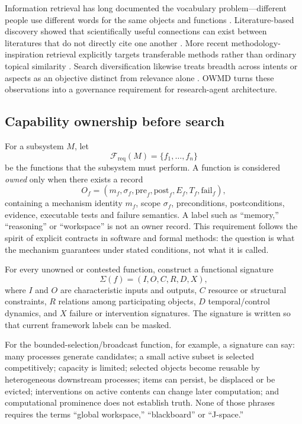 \documentclass[11pt]{article}
\begin{document}
Information retrieval has long documented the vocabulary problem---different people use different words for the same objects and functions \cite{furnas1987}. Literature-based discovery showed that scientifically useful connections can exist between literatures that do not directly cite one another \cite{swanson1986}. More recent methodology-inspiration retrieval explicitly targets transferable methods rather than ordinary topical similarity \cite{garikaparthi2025}. Search diversification likewise treats breadth across intents or aspects as an objective distinct from relevance alone \cite{carbonell1998}. OWMD turns these observations into a governance requirement for research-agent architecture.

\subsection{Capability ownership before search}

For a subsystem \(M\), let
\[
\mathcal F_{\mathrm{req}}(M)=\{f_1,\ldots,f_n\}
\]
be the functions that the subsystem must perform. A function is considered \emph{owned} only when there exists a record
\[
O_f=(m_f,\sigma_f,\mathrm{pre}_f,\mathrm{post}_f,E_f,T_f,\mathrm{fail}_f),
\]
containing a mechanism identity \(m_f\), scope \(\sigma_f\), preconditions, postconditions, evidence, executable tests and failure semantics. A label such as ``memory,'' ``reasoning'' or ``workspace'' is not an owner record. This requirement follows the spirit of explicit contracts in software and formal methods: the question is what the mechanism guarantees under stated conditions, not what it is called.

For every unowned or contested function, construct a functional signature
\[
\Sigma(f)=(I,O,C,R,D,X),
\]
where \(I\) and \(O\) are characteristic inputs and outputs, \(C\) resource or structural constraints, \(R\) relations among participating objects, \(D\) temporal/control dynamics, and \(X\) failure or intervention signatures. The signature is written so that current framework labels can be masked.

For the bounded-selection/broadcast function, for example, a signature can say: many processes generate candidates; a small active subset is selected competitively; capacity is limited; selected objects become reusable by heterogeneous downstream processes; items can persist, be displaced or be evicted; interventions on active contents can change later computation; and computational prominence does not establish truth. None of those phrases requires the terms ``global workspace,'' ``blackboard'' or ``J-space.''
\end{document}
